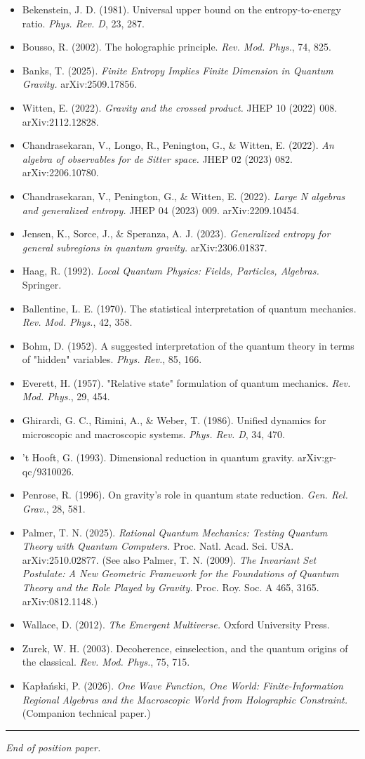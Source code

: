 \documentclass[11pt,a4paper]{article}
\begin{document}
\begin{itemize}
  \item Bekenstein, J. D. (1981). Universal upper bound on the entropy-to-energy ratio. \emph{Phys. Rev. D}, 23, 287.
  \item Bousso, R. (2002). The holographic principle. \emph{Rev. Mod. Phys.}, 74, 825.
  \item Banks, T. (2025). \emph{Finite Entropy Implies Finite Dimension in Quantum Gravity.} arXiv:2509.17856.
  \item Witten, E. (2022). \emph{Gravity and the crossed product.} JHEP 10 (2022) 008. arXiv:2112.12828.
  \item Chandrasekaran, V., Longo, R., Penington, G., \& Witten, E. (2022). \emph{An algebra of observables for de Sitter space.} JHEP 02 (2023) 082. arXiv:2206.10780.
  \item Chandrasekaran, V., Penington, G., \& Witten, E. (2022). \emph{Large N algebras and generalized entropy.} JHEP 04 (2023) 009. arXiv:2209.10454.
  \item Jensen, K., Sorce, J., \& Speranza, A. J. (2023). \emph{Generalized entropy for general subregions in quantum gravity.} arXiv:2306.01837.
  \item Haag, R. (1992). \emph{Local Quantum Physics: Fields, Particles, Algebras.} Springer.
  \item Ballentine, L. E. (1970). The statistical interpretation of quantum mechanics. \emph{Rev. Mod. Phys.}, 42, 358.
  \item Bohm, D. (1952). A suggested interpretation of the quantum theory in terms of "hidden" variables. \emph{Phys. Rev.}, 85, 166.
  \item Everett, H. (1957). "Relative state" formulation of quantum mechanics. \emph{Rev. Mod. Phys.}, 29, 454.
  \item Ghirardi, G. C., Rimini, A., \& Weber, T. (1986). Unified dynamics for microscopic and macroscopic systems. \emph{Phys. Rev. D}, 34, 470.
  \item 't Hooft, G. (1993). Dimensional reduction in quantum gravity. arXiv:gr-qc/9310026.
  \item Penrose, R. (1996). On gravity's role in quantum state reduction. \emph{Gen. Rel. Grav.}, 28, 581.
  \item Palmer, T. N. (2025). \emph{Rational Quantum Mechanics: Testing Quantum Theory with Quantum Computers.} Proc. Natl. Acad. Sci. USA. arXiv:2510.02877. (See also Palmer, T. N. (2009). \emph{The Invariant Set Postulate: A New Geometric Framework for the Foundations of Quantum Theory and the Role Played by Gravity.} Proc. Roy. Soc. A 465, 3165. arXiv:0812.1148.)
  \item Wallace, D. (2012). \emph{The Emergent Multiverse.} Oxford University Press.
  \item Zurek, W. H. (2003). Decoherence, einselection, and the quantum origins of the classical. \emph{Rev. Mod. Phys.}, 75, 715.
  \item Kapłański, P. (2026). \emph{One Wave Function, One World: Finite-Information Regional Algebras and the Macroscopic World from Holographic Constraint.} (Companion technical paper.)
\end{itemize}

\medskip\hrule\medskip

\emph{End of position paper.}
\end{document}
